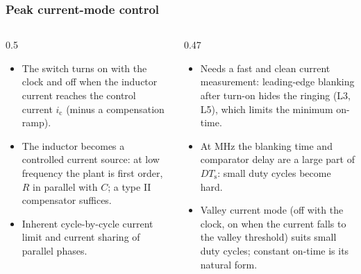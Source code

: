 \begin{frame}
	\frametitle{Peak current-mode control}
	\begin{columns}[T]
		\begin{column}{0.5\textwidth}
			\small
			\begin{itemize}
				\item The switch turns on with the clock and off when the inductor current reaches the control current $i_\mathrm{c}$ (minus a compensation ramp).
				\item The inductor becomes a controlled current source: at low frequency the plant is first order, $R$ in parallel with $C$; a type II compensator suffices.
				\item Inherent cycle-by-cycle current limit and current sharing of parallel phases.
			\end{itemize}
		\end{column}
		\begin{column}{0.47\textwidth}
			\small
			\begin{itemize}
				\item Needs a fast and clean current measurement: leading-edge blanking after turn-on hides the ringing (L3, L5), which limits the minimum on-time.
				\item At MHz the blanking time and comparator delay are a large part of $DT_\mathrm{s}$: small duty cycles become hard.
				\item Valley current mode (off with the clock, on when the current falls to the valley threshold) suits small duty cycles; constant on-time is its natural form.
			\end{itemize}
		\end{column}
	\end{columns}
\end{frame}

